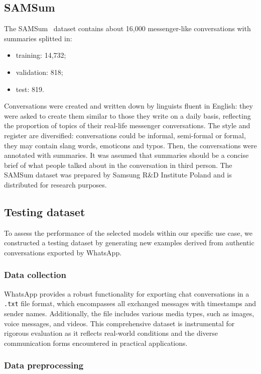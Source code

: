 \documentclass[10pt,twocolumn,letterpaper]{article}
\begin{document}
\subsection{SAMSum}

The SAMSum~\cite{DBLP:journals/corr/abs-1911-12237} dataset contains about 16,000 messenger-like conversations with summaries splitted in:
\begin{itemize}
    \item training: 14,732;
    \item validation: 818;
    \item test: 819.
\end{itemize}
Conversations were created and written down by linguists fluent in English: they were asked to create them similar to those they write on a daily basis, reflecting the proportion of topics of their real-life messenger conversations. 
The style and register are diversified: conversations could be informal, semi-formal or formal, 
they may contain slang words, emoticons and typos. Then, the conversations were annotated with summaries. 
It was assumed that summaries should be a concise brief of what people talked about in the conversation in third person. 
The SAMSum dataset was prepared by Samsung R\&D Institute Poland and is distributed for research purposes.

\subsection{Testing dataset}
To assess the performance of the selected models within our specific use case, we constructed a testing dataset by generating new examples derived from authentic conversations exported by WhatsApp.

\subsubsection{Data collection}

\hspace{1em}WhatsApp provides a robust functionality for exporting chat conversations in a \texttt{.txt} file format, which encompasses all exchanged messages with timestamps and sender names. 
Additionally, the file includes various media types, such as images, voice messages, and videos. 
This comprehensive dataset is instrumental for rigorous evaluation as it reflects real-world conditions and the diverse communication forms encountered in practical applications.

\subsubsection{Data preprocessing}
\end{document}
